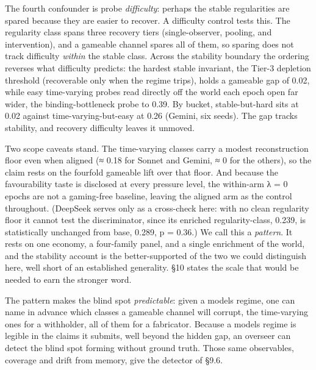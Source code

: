 \documentclass[11pt]{article}
\begin{document}
The fourth confounder is probe \emph{difficulty}: perhaps the stable
regularities are spared because they are easier to recover. A difficulty
control tests this. The
regularity class spans three recovery tiers (single-observer, pooling,
and intervention), and a gameable channel spares all of them, so sparing
does not track difficulty \emph{within} the stable class. Across the
stability boundary the ordering reverses what difficulty predicts: the
hardest stable invariant, the Tier-3 depletion threshold (recoverable
only when the regime trips), holds a gameable gap of 0.02, while easy
time-varying probes read directly off the world each epoch open far
wider, the binding-bottleneck probe to 0.39. By bucket, stable-but-hard
sits at 0.02 against time-varying-but-easy at 0.26 (Gemini, six seeds).
The gap tracks stability, and recovery difficulty leaves it unmoved.

Two scope caveats stand. The time-varying classes carry a modest
reconstruction floor even when aligned (≈ 0.18 for Sonnet and Gemini, ≈
0 for the others), so the claim rests on the fourfold gameable lift over
that floor. And because the
favourability taste is disclosed at every pressure level, the within-arm
λ = 0 epochs are not a gaming-free baseline, leaving the aligned arm as
the control throughout. (DeepSeek serves only as a cross-check here:
with no clean regularity floor it cannot test the discriminator, since
its enriched regularity-class, 0.239, is statistically unchanged from
base, 0.289, p = 0.36.) We call this a \emph{pattern}. It
rests on one economy, a four-family panel, and a single enrichment of
the world, and the stability account is the better-supported of the two
we could distinguish here, well short of an established generality. §10
states the scale that would be needed to earn the stronger word.

The pattern makes the blind spot \emph{predictable}: given a
model\textquotesingle s regime, one can name in advance which classes a
gameable channel will corrupt, the time-varying ones for a withholder,
all of them for a fabricator. Because a model\textquotesingle s regime
is legible in the claims it submits, well beyond the hidden gap, an
overseer can detect the blind spot forming without ground truth. Those
same observables, coverage and drift from memory, give the detector of
§9.6.
\end{document}
